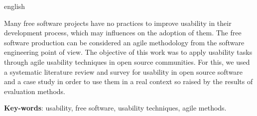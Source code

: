 \begin{resumo}[Abstract]
  \begin{otherlanguage*}{english}

Many free software projects have no practices to improve usability in their development process, which may influences on the adoption of them.
%
The free software production can be considered an agile methodology from the software engineering point of view.
%
The objective of this work was to apply usability tasks through agile usability techniques in open source communities.
%
For this, we used a systematic literature review and survey for usability in open source software and a case study in order to use them in a real context so raised by the results of evaluation methods.

  \vspace{\onelineskip}
 
  \noindent 
  \textbf{Key-words}: usability, free software, usability techniques, agile methods.
  \end{otherlanguage*}
\end{resumo}


